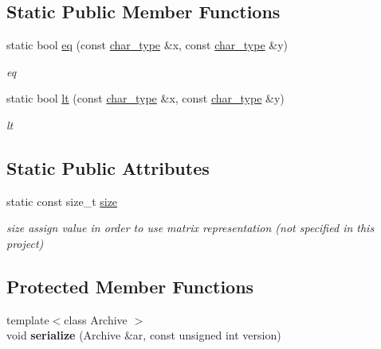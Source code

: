 \subsection*{Static Public Member Functions}
\begin{DoxyCompactItemize}
\item 
static bool \hyperlink{class_net_transition_a00ab091a8fa7d42fbba4ed634018c5a3}{eq} (const \hyperlink{class_net_transition_a40ad367a5a816d31e7559037c76970f0}{char\+\_\+type} \&x, const \hyperlink{class_net_transition_a40ad367a5a816d31e7559037c76970f0}{char\+\_\+type} \&y)
\begin{DoxyCompactList}\small\item\em eq \end{DoxyCompactList}\item 
static bool \hyperlink{class_net_transition_a30a9ecc563b03dd594afb1077353c1a2}{lt} (const \hyperlink{class_net_transition_a40ad367a5a816d31e7559037c76970f0}{char\+\_\+type} \&x, const \hyperlink{class_net_transition_a40ad367a5a816d31e7559037c76970f0}{char\+\_\+type} \&y)
\begin{DoxyCompactList}\small\item\em lt \end{DoxyCompactList}\end{DoxyCompactItemize}
\subsection*{Static Public Attributes}
\begin{DoxyCompactItemize}
\item 
static const size\+\_\+t \hyperlink{class_net_transition_a1db4742635a4e9d3b6cce5e5669f2ea7}{size}\hypertarget{class_net_transition_a1db4742635a4e9d3b6cce5e5669f2ea7}{}\label{class_net_transition_a1db4742635a4e9d3b6cce5e5669f2ea7}

\begin{DoxyCompactList}\small\item\em size assign value in order to use matrix representation (not specified in this project) \end{DoxyCompactList}\end{DoxyCompactItemize}
\subsection*{Protected Member Functions}
\begin{DoxyCompactItemize}
\item 
{\footnotesize template$<$class Archive $>$ }\\void {\bfseries serialize} (Archive \&ar, const unsigned int version)\hypertarget{class_net_transition_ab6341feb03a31ba89d660a07a94f43e8}{}\label{class_net_transition_ab6341feb03a31ba89d660a07a94f43e8}

\end{DoxyCompactItemize}
